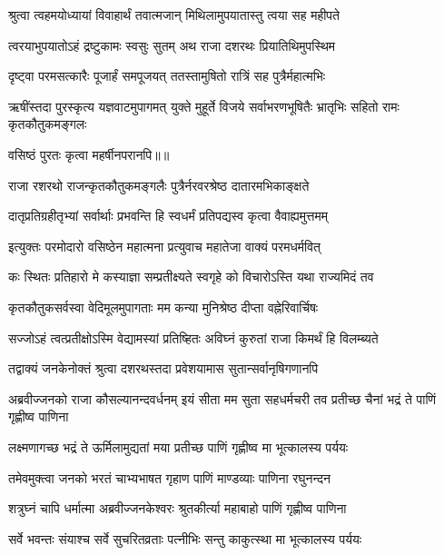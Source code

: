 \twolineshloka
{श्रुत्वा त्वहमयोध्यायां विवाहार्थं तवात्मजान्}
{मिथिलामुपयातास्तु त्वया सह महीपते} %

\twolineshloka
{त्वरयाभुपयातोऽहं द्रष्टुकामः स्वसुः सुतम्}
{अथ राजा दशरथः प्रियातिथिमुपस्थिम} %

\twolineshloka
{दृष्ट्वा परमसत्कारैः पूजार्हं समपूजयत्}
{ततस्तामुषितो रात्रिं सह पुत्रैर्महात्मभिः} %

\threelineshloka
{ऋषींस्तदा पुरस्कृत्य यज्ञवाटमुपागमत्}
{युक्ते मुहूर्ते विजये सर्वाभरणभूषितैः}
{भ्रातृभिः सहितो रामः कृतकौतुकमङ्गलः} %

{वसिष्ठं पुरतः कृत्वा महर्षीनपरानपि॥॥} %

\addtocounter{shlokacount}{1}

\twolineshloka
{राजा रशरथो राजन्कृतकौतुकमङ्गलैः}
{पुत्रैर्नरवरश्रेष्ठ दातारमभिकाङ्क्षते} %

\twolineshloka
{दातृप्रतिग्रहीतृभ्यां सर्वार्थाः प्रभवन्ति हि}
{स्वधर्मं प्रतिपद्यस्व कृत्वा वैवाह्यमुत्तमम्} %

\twolineshloka
{इत्युक्तः परमोदारो वसिष्ठेन महात्मना}
{प्रत्युवाच महातेजा वाक्यं परमधर्मवित्} %

\twolineshloka
{कः स्थितः प्रतिहारो मे कस्याज्ञा सम्प्रतीक्ष्यते}
{स्वगृहे को विचारोऽस्ति यथा राज्यमिदं तव} %

\twolineshloka
{कृतकौतुकसर्वस्वा वेदिमूलमुपागताः}
{मम कन्या मुनिश्रेष्ठ दीप्ता वह्नेरिवार्चिषः} %

\twolineshloka
{सज्जोऽहं त्वत्प्रतीक्षोऽस्मि वेद्यामस्यां प्रतिष्हितः}
{अविघ्नं कुरुतां राजा किमर्थं हि विलम्ब्यते} %

\twolineshloka
{तद्वाक्यं जनकेनोक्तं श्रुत्वा दशरथस्तदा}
{प्रवेशयामास सुतान्सर्वानृषिगणानपि} %

\threelineshloka
{अब्रवीज्जनको राजा कौसल्यानन्दवर्धनम्}
{इयं सीता मम सुता सहधर्मचरी तव}
{प्रतीच्छ चैनां भद्रं ते पाणिं गृह्णीष्व पाणिना} %

\twolineshloka
{लक्ष्मणागच्छ भद्रं ते ऊर्मिलामुद्यतां मया}
{प्रतीच्छ पाणिं गृह्णीष्व मा भूत्कालस्य पर्ययः} %

\twolineshloka
{तमेवमुक्त्वा जनको भरतं चाभ्यभाषत}
{गृहाण पाणिं माण्डव्याः पाणिना रघुनन्दन} %

\twolineshloka
{शत्रुघ्नं चापि धर्मात्मा अब्रवीज्जनकेश्वरः}
{श्रुतकीर्त्या महाबाहो पाणिं गृह्णीष्व पाणिना} %

\twolineshloka
{सर्वे भवन्तः संयाश्च सर्वे सुचरितव्रताः}
{पत्नीभिः सन्तु काकुत्स्था मा भूत्कालस्य पर्ययः} %

